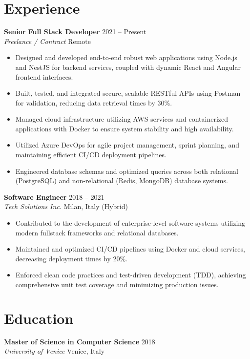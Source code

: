 \documentclass[11pt,a4paper]{article}
\begin{document}
\section*{Experience}
\noindent
\textbf{Senior Full Stack Developer} \hfill 2021 -- Present \\
\textit{Freelance / Contract} \hfill Remote
\begin{itemize}[leftmargin=*]
    \item Designed and developed end-to-end robust web applications using Node.js and NestJS for backend services, coupled with dynamic React and Angular frontend interfaces.
    \item Built, tested, and integrated secure, scalable RESTful APIs using Postman for validation, reducing data retrieval times by 30\%.
    \item Managed cloud infrastructure utilizing AWS services and containerized applications with Docker to ensure system stability and high availability.
    \item Utilized Azure DevOps for agile project management, sprint planning, and maintaining efficient CI/CD deployment pipelines.
    \item Engineered database schemas and optimized queries across both relational (PostgreSQL) and non-relational (Redis, MongoDB) database systems.
\end{itemize}

\vspace{2mm}
\noindent
\textbf{Software Engineer} \hfill 2018 -- 2021 \\
\textit{Tech Solutions Inc.} \hfill Milan, Italy (Hybrid)
\begin{itemize}[leftmargin=*]
    \item Contributed to the development of enterprise-level software systems utilizing modern fullstack frameworks and relational databases.
    \item Maintained and optimized CI/CD pipelines using Docker and cloud services, decreasing deployment times by 20\%.
    \item Enforced clean code practices and test-driven development (TDD), achieving comprehensive unit test coverage and minimizing production issues.
\end{itemize}

\section*{Education}
\noindent
\textbf{Master of Science in Computer Science} \hfill 2018 \\
\textit{University of Venice} \hfill Venice, Italy
\end{document}
